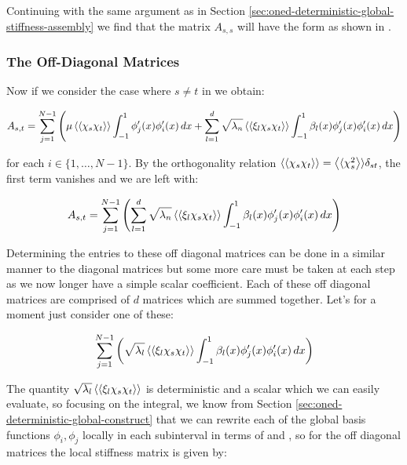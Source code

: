 Continuing with the same argument as in Section
\ref{sec:oned-deterministic-global-stiffness-assembly} we find that the matrix
$A_{s,s}$ will have the form as shown in
.

\subsubsection{The Off-Diagonal Matrices}

Now if we consider the case where $s \neq t$ in
 we obtain:

\begin{equation}\label{eq:oned-stochastic-off-diagonal-stiffness}
    A_{s,t} = \sum_{j=1}^{N - 1}\left(\mu\left\langle\langle\chi_s\chi_t\right\rangle\rangle
        \int_{-1}^1 \phi_j'(x)\phi_i'(x)\, dx
       + \sum_{l=1}^d\sqrt{\lambda_n}\left\langle\langle\xi_l\chi_s\chi_t\right\rangle\rangle
       \int_{-1}^1 \beta_l(x)\phi_j'(x)\phi_i'(x)\, dx\right)
\end{equation}

for each $i \in \{1,\ldots,N-1\}$. By the orthogonality relation
$\left\langle\langle\chi_s\chi_t\right\rangle\rangle = \left\langle\langle\chi_s^2\right\rangle\rangle\delta_{st}$, the first term vanishes
and we are left with:

\begin{equation}
    A_{s,t} = \sum_{j=1}^{N - 1}\left(
        \sum_{l=1}^d\sqrt{\lambda_n}\left\langle\langle\xi_l\chi_s\chi_t\right\rangle\rangle
            \int_{-1}^1\beta_l(x)\phi_j'(x)\phi_i'(x)\, dx\right)
\end{equation}

Determining the entries to these off diagonal matrices can be done in a similar
manner to the diagonal matrices but some more care must be taken at each step
as we now longer have a simple scalar coefficient. Each of these off diagonal
matrices are comprised of $d$ matrices which are summed together. Let's for a
moment just consider one of these:

\begin{equation}
    \sum_{j=1}^{N - 1}\left(\sqrt{\lambda_l}\left\langle\langle\xi_l\chi_s\chi_t\right\rangle\rangle
        \int_{-1}^1\beta_l(x)\phi_j'(x)\phi_i'(x)\, dx\right)
\end{equation}

The quantity $\sqrt{\lambda_l}\left\langle\langle\xi_l\chi_s\chi_t\right\rangle\rangle$ is deterministic and
a scalar which we can easily evaluate, so focusing on the integral, we know
from Section \ref{sec:oned-deterministic-global-construct} that we can rewrite
each of the global basis functions $\phi_i,\phi_j$ locally in each subinterval
in terms of  and
, so for the off diagonal matrices the local
stiffness matrix is given by:

